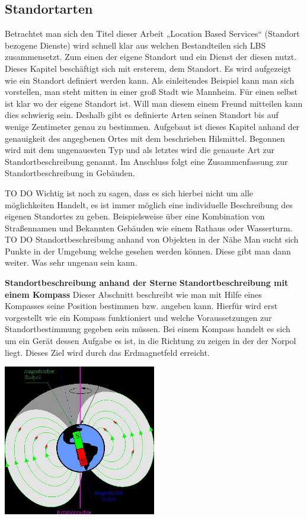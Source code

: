 \subsection{Standortarten}




Betrachtet man sich den Titel dieser Arbeit „Location Based Services“ (Standort bezogene Dienste) wird schnell klar aus welchen Bestandteilen sich LBS zusammensetzt. Zum einen der eigene Standort und ein Dienst der diesen nutzt. Dieses Kapitel beschäftigt sich mit ersterem, dem Standort. Es wird aufgezeigt wie ein Standort definiert werden kann.
Als einleitendes Beispiel kann man sich vorstellen, man steht mitten in einer groß Stadt wie Mannheim. Für einen selbst ist klar wo der eigene Standort ist. Will man diesem einem Freund mitteilen kann dies schwierig sein. Deshalb gibt es definierte Arten seinen Standort bis auf wenige Zentimeter genau zu bestimmen. Aufgebaut ist dieses Kapitel anhand der genauigkeit des angegbenen Ortes mit dem beschrieben Hilsmittel. Begonnen wird mit dem ungenauesten Typ und als letztes wird die genauste Art zur Standortbeschreibung genannt. Im Anschluss folgt eine Zusammenfassung zur Standortbeschreibung in Gebäuden.

TO DO
Wichtig ist noch zu sagen, dass es sich hierbei nicht um alle möglichkeiten Handelt, es ist immer möglich eine individuelle Beschreibung des eigenen Standortes zu geben. Beispielsweise über eine Kombination von Straßennamen und Bekannten Gebäuden wie einem Rathaus oder Wasserturm. 
TO DO
Standortbeschreibung anhand von Objekten in der Nähe
Man sucht sich Punkte in der Umgebung welche gesehen werden können. Diese gibt man dann weiter. Was sehr ungenau sein kann.

\textbf{Standortbeschreibung anhand der Sterne}
\textbf{Standortbeschreibung mit einem Kompass}
Dieser Abschnitt beschreibt wie man mit Hilfe eines Kompasses seine Position bestimmen bzw. angeben kann. Hierfür wird erst vorgestellt wie ein Kompass funktioniert und welche Voraussetzungen zur Standortbestimmung gegeben sein müssen.
Bei einem Kompass handelt es sich um ein Gerät dessen Aufgabe es ist, in die Richtung zu zeigen in der der Norpol liegt. Dieses Ziel wird durch das Erdmagnetfeld erreicht.

\includegraphics[width=0.50\textwidth]{ref/images/magnetfeld.jpg}
 
